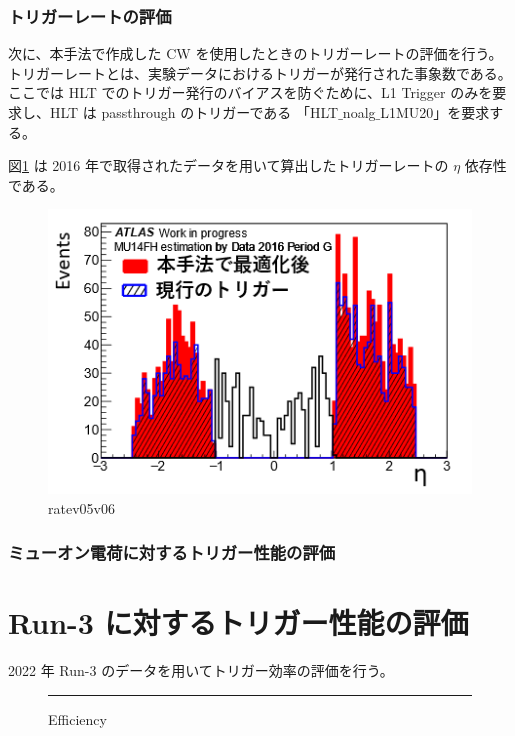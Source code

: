 \subsubsection{トリガーレートの評価}
次に、本手法で作成した CW を使用したときのトリガーレートの評価を行う。トリガーレートとは、実験データにおけるトリガーが発行された事象数である。ここでは HLT でのトリガー発行のバイアスを防ぐために、L1 Trigger のみを要求し、HLT は passthrough のトリガーである 「HLT$\_$noalg$\_$L1MU20」を要求する。

図\ref{fig:Ratev05v06} は 2016 年で取得されたデータを用いて算出したトリガーレートの $\eta$ 依存性である。

\begin{figure}[tb]
  \centering
  \includegraphics[clip, width=12cm]{fig/4/rate_v05_v06.png}
  \caption{ratev05v06}
  \label{fig:Ratev05v06}
\end{figure}

\subsubsection{ミューオン電荷に対するトリガー性能の評価}














\section{Run-3 に対するトリガー性能の評価}
2022 年 Run-3 のデータを用いてトリガー効率の評価を行う。
\begin{figure}[tb]
  \centering
  \rule{8cm}{6cm}
  \caption{Efficiency}
  \label{fig:fit_def}
\end{figure}

